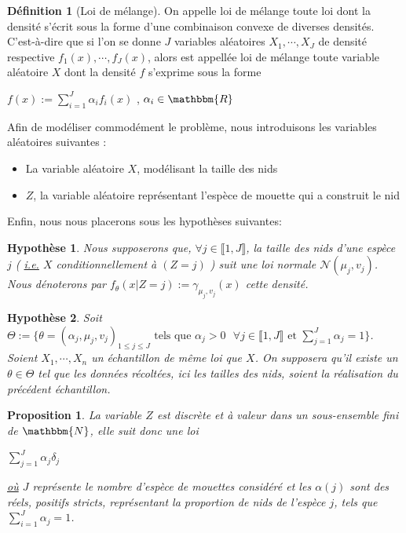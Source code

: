 \documentclass[frenchb]{report}
\newcommand{\R}{\mathbbm{R}}
\newcommand{\N}{\mathbbm{N}}
\newcommand{\1}{\mathbbm{1}}
\newcommand{\n}{\mathcal{N}}
\newtheorem{prop}{Proposition}
\newtheorem{hyp}{Hypothèse}
\theoremstyle{definition}\newtheorem{defn}{Définition}
\theoremstyle{definition}\newtheorem{exm}{Exemple}
\theoremstyle{definition}\newtheorem{nota}{Notation}
\theoremstyle{definition}\newtheorem{rem}{Remarque}
\begin{document}
\begin{defn}[Loi de mélange]
On appelle loi de mélange toute loi dont la densité s'écrit sous la forme d'une combinaison convexe de diverses densités. C'est-à-dire que si l'on se donne $J$ variables aléatoires $X_1, \cdots, X_J$ de densité respective $f_1(x), \cdots, f_J(x)$, alors est appellée loi de mélange toute variable aléatoire $X$ dont la densité $f$ s'exprime sous la forme
\begin{center} $f(x) := \displaystyle\sum_{i=1}^J \alpha_i f_i(x)$ , $\alpha_i \in\R$ \end{center}

\end{defn}

Afin de modéliser commodément le problème, nous introduisons les variables aléatoires suivantes :

\begin{itemize}[label=\adfflowerleft]
	\item La variable aléatoire $X$, modélisant la taille des nids
	\item $Z$, la variable aléatoire représentant l'espèce de mouette qui a construit le nid
\end{itemize}

Enfin, nous nous placerons sous les hypothèses suivantes:

\begin{hyp}
Nous supposerons que, $\forall j\in \llbracket 1,J \rrbracket$, la taille des nids d'une espèce $j$ ( \underline{i.e.} $X$ conditionnellement à $(Z=j)$ ) suit une loi normale $\n(\mu_j,v_j)$. Nous dénoterons par $f_\theta(x | Z = j) := \gamma_{\mu_j, v_j}(x)$ cette densité.
\end{hyp}


\begin{hyp}
Soit $\Theta := \{ \theta = (\alpha_j,\mu_j, v_j)_{1 \leq j \leq J} \text{ tels que } \alpha_j > 0 \text{ } \forall j\in \llbracket 1,J\rrbracket \text{ et } \displaystyle\sum_{j=1}^J\alpha_j=1\}$. Soient $X_1, \cdots, X_n$ un échantillon de même loi que $X$. On supposera qu'il existe un $\theta \in \Theta$ tel que les données récoltées, ici les tailles des nids, soient la réalisation du précédent échantillon.
\end{hyp}

\begin{prop}
La variable $Z$ est discrète et à valeur dans un sous-ensemble fini de $\N$, elle suit donc une loi 
\begin{center} $\displaystyle \sum_{j=1}^J \alpha_j\delta_j$ \end{center}
\underline{où} $J$ représente le nombre d'espèce de mouettes considéré et les $\alpha(j)$ sont des réels, positifs stricts, représentant la proportion de nids de l'espèce $j$, tels que $\displaystyle\sum_{i=1}^J \alpha_j = 1$.
\end{prop}
\end{document}
